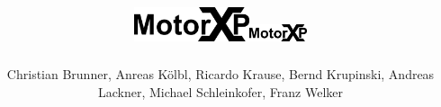 \documentclass[14pt]{beamer}
\title{\includegraphics[height=1cm]{../images/MotorXP}}
\author{Christian Brunner, Anreas Kölbl, Ricardo Krause, Bernd Krupinski, Andreas Lackner, Michael Schleinkofer, Franz Welker}
\begin{document}
\begingroup
\makeatletter
\setlength{\hoffset}{-.5\beamer@sidebarwidth}
\makeatother
\begin{frame}[plain]
  \titlepage
\end{frame}
\endgroup
  \title{\includegraphics[height=0.5cm]{../images/MotorXP}}
  \author{}




\end{document}
